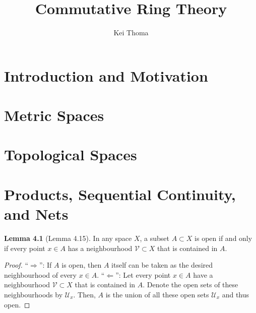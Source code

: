\documentclass[a4paper]{book}
\title{Commutative Ring Theory}
\author{Kei Thoma}
\theoremstyle{definition}
\newtheorem{lemma}[definition]{Lemma}
\begin{document}
\maketitle
\tableofcontents
\chapter{Introduction and Motivation}
\chapter{Metric Spaces}
\chapter{Topological Spaces}
\chapter{Products, Sequential Continuity, and Nets}

\begin{thmbox}
    \begin{lemma}[Lemma 4.15]
        In any space \(X\), a subset \(A \subset X\) is open if and only if every point \(x \in A\) has a neighbourhood \(\mathcal{V} \subset X\) that is contained in \(A\).
    \end{lemma}
\end{thmbox}
\begin{proof}
    ``\(\Rightarrow\)'': If \(A\) is open, then \(A\) itself can be taken as the desired neighbourhood of every \(x \in A\).
    ``\(\Leftarrow\)'': Let every point \(x \in A\) have a neighbourhood \(\mathcal{V} \subset X\) that is contained in \(A\). Denote the open sets of these neighbourhoods by \(\mathcal{U}_x\). Then, \(A\) is the union of all these open sets \(\mathcal{U}_x\) and thus open.
\end{proof}
\end{document}

